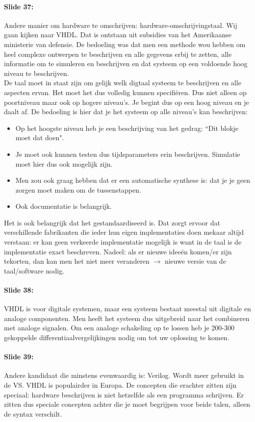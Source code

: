 \documentclass[10pt,a4paper]{book}
\begin{document}
\paragraph{Slide 37:} Andere manier om hardware te omschrijven: hardware-omschrijvingstaal. Wij gaan kijken naar VHDL. Dat is ontstaan uit subsidies van het Amerikaanse ministerie van defensie. De bedoeling was dat men een methode wou hebben om heel complexe ontwerpen te beschrijven en alle gegevens erbij te zetten, alle informatie om te simuleren en beschrijven en dat systeem op een voldoende hoog niveau te beschrijven.\\
De taal moet in staat zijn om gelijk welk digtaal systeem te beschrijven en alle aspecten ervan. Het moet het dus volledig kunnen specifi\"eren. Dus niet alleen op poortniveau maar ook op hogere niveau's. Je begint dus op een hoog niveau en je daalt af. De bedoeling is hier dat je het systeem op alle niveau's kan beschrijven:
\begin{itemize}
\item Op het hoogste niveau heb je een beschrijving van het gedrag: ``Dit blokje moet dat doen". 
\item Je moet ook kunnen testen dus tijdsparameters erin beschrijven. Simulatie moet hier dus ook mogelijk zijn. 
\item Men zou ook graag hebben dat er een automatische synthese is: dat je je geen zorgen moet maken om de tussenstappen. 
\item Ook documentatie is belangrijk. 
\end{itemize}
Het is ook belangrijk dat het gestandaardiseerd is. Dat zorgt ervoor dat verschillende fabrikanten die ieder hun eigen implementaties doen mekaar altijd verstaan: er kan geen verkeerde implementatie mogelijk is want in de taal is de implementatie exact beschreven. Nadeel: als er nieuwe idee\"en komen/er zijn tekorten, dan kan men het niet meer veranderen $\rightarrow$ nieuwe versie van de taal/software nodig.

\paragraph{Slide 38:} VHDL is voor digitale systemen, maar een systeem bestaat meestal uit digitale en analoge componenten. Men heeft het systeem dus uitgebreid naar het combineren met analoge signalen. Om een analoge schakeling op te lossen heb je 200-300 gekoppelde differentiaalvergelijkingen nodig om tot uw oplossing te komen. 

\paragraph{Slide 39:} Andere kandidaat die minstens evenwaardig is: Verilog. Wordt meer gebruikt in de VS. VHDL is populairder in Europa. De concepten die erachter zitten zijn speciaal: hardware beschrijven is niet hetzelfde als een programma schrijven. Er zitten dus speciale concepten achter die je moet begrijpen voor beide talen, alleen de syntax verschilt. 
\end{document}
